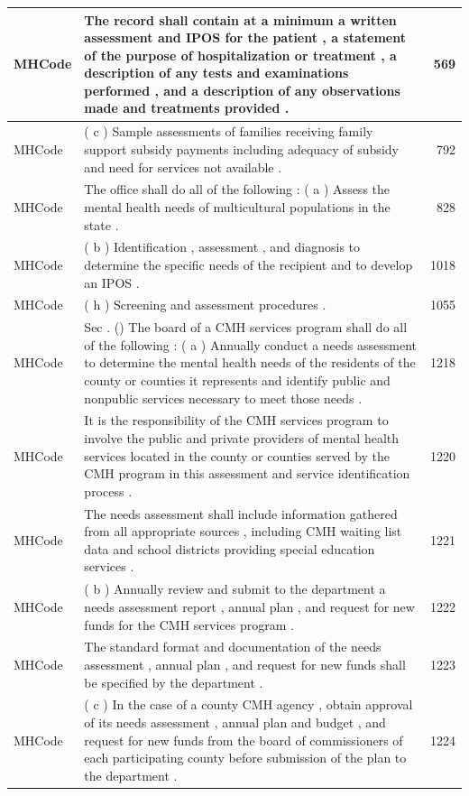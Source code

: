 \documentclass[
]{book}
\begin{document}
\begin{tabular}{l|l|r}
\hline
MHCode & The record shall contain at a minimum a written assessment and IPOS for the patient , a statement of the purpose of hospitalization or treatment , a description of any tests and examinations performed , and a description of any observations made and treatments provided . & 569\\
\hline
MHCode & ( c ) Sample assessments of families receiving family support subsidy payments including adequacy of subsidy and need for services not available . & 792\\
\hline
MHCode & The office shall do all of the following : ( a ) Assess the mental health needs of multicultural populations in the state . & 828\\
\hline
MHCode & ( b ) Identification , assessment , and diagnosis to determine the specific needs of the recipient and to develop an IPOS . & 1018\\
\hline
MHCode & ( h ) Screening and assessment procedures . & 1055\\
\hline
MHCode & Sec . () The board of a CMH services program shall do all of the following : ( a ) Annually conduct a needs assessment to determine the mental health needs of the residents of the county or counties it represents and identify public and nonpublic services necessary to meet those needs . & 1218\\
\hline
MHCode & It is the responsibility of the CMH services program to involve the public and private providers of mental health services located in the county or counties served by the CMH program in this assessment and service identification process . & 1220\\
\hline
MHCode & The needs assessment shall include information gathered from all appropriate sources , including CMH waiting list data and school districts providing special education services . & 1221\\
\hline
MHCode & ( b ) Annually review and submit to the department a needs assessment report , annual plan , and request for new funds for the CMH services program . & 1222\\
\hline
MHCode & The standard format and documentation of the needs assessment , annual plan , and request for new funds shall be specified by the department . & 1223\\
\hline
MHCode & ( c ) In the case of a county CMH agency , obtain approval of its needs assessment , annual plan and budget , and request for new funds from the board of commissioners of each participating county before submission of the plan to the department . & 1224\\

\end{tabular}
\end{document}
